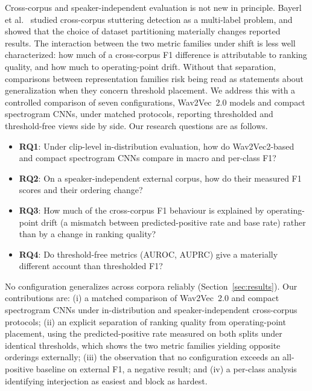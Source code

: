 \documentclass[a4paper,orivec]{llncs}
\begin{document}
Cross-corpus and speaker-independent evaluation is not new in principle. Bayerl
et al.~\cite{bayerl2023crosscorpus} studied cross-corpus stuttering detection as
a multi-label problem, and~\cite{bayerl2022partitioning} showed that the choice of
dataset partitioning materially changes reported results. The interaction between
the two metric families under shift is less well characterized: how much of a
cross-corpus F1 difference is attributable to ranking quality, and how much to
operating-point drift. Without that separation, comparisons between representation
families risk being read as statements about generalization when they concern
threshold placement. We address this with a controlled comparison of seven
configurations, Wav2Vec~2.0 models and compact spectrogram CNNs, under matched
protocols, reporting thresholded and threshold-free views side by side. Our
research questions are as follows.
\begin{itemize}
\item \textbf{RQ1}: Under clip-level in-distribution evaluation, how do
Wav2Vec2-based and compact spectrogram CNNs compare in macro and per-class F1?
\item \textbf{RQ2}: On a speaker-independent external corpus, how do their
measured F1 scores and their ordering change?
\item \textbf{RQ3}: How much of the cross-corpus F1 behaviour is explained by
operating-point drift (a mismatch between predicted-positive rate and base rate)
rather than by a change in ranking quality?
\item \textbf{RQ4}: Do threshold-free metrics (AUROC, AUPRC) give a materially
different account than thresholded F1?
\end{itemize}

No configuration generalizes across corpora reliably
(Section~\ref{sec:results}). Our contributions are: (i) a matched comparison of
Wav2Vec~2.0 and compact spectrogram CNNs under in-distribution and
speaker-independent cross-corpus protocols; (ii) an explicit separation of ranking
quality from operating-point placement, using the predicted-positive rate measured
on both splits under identical thresholds, which shows the two metric families
yielding opposite orderings externally; (iii) the observation that no
configuration exceeds an all-positive baseline on external F1, a negative result;
and (iv) a per-class analysis identifying interjection as easiest and block as
hardest.

\end{document}
